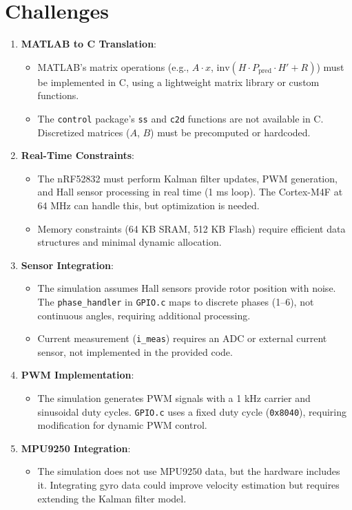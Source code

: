 \documentclass[a4paper,11pt]{article}
\begin{document}
\section{Challenges}
\begin{enumerate}
    \item \textbf{MATLAB to C Translation}:
    \begin{itemize}
        \item MATLAB's matrix operations (e.g., $A \cdot x$, $\text{inv}(H \cdot P_{\text{pred}} \cdot H' + R)$) must be implemented in C, using a lightweight matrix library or custom functions.
        \item The \texttt{control} package's \texttt{ss} and \texttt{c2d} functions are not available in C. Discretized matrices ($A$, $B$) must be precomputed or hardcoded.
    \end{itemize}
    \item \textbf{Real-Time Constraints}:
    \begin{itemize}
        \item The nRF52832 must perform Kalman filter updates, PWM generation, and Hall sensor processing in real time (1 ms loop). The Cortex-M4F at 64 MHz can handle this, but optimization is needed.
        \item Memory constraints (64 KB SRAM, 512 KB Flash) require efficient data structures and minimal dynamic allocation.
    \end{itemize}
    \item \textbf{Sensor Integration}:
    \begin{itemize}
        \item The simulation assumes Hall sensors provide rotor position with noise. The \texttt{phase\_handler} in \texttt{GPIO.c} maps to discrete phases (1--6), not continuous angles, requiring additional processing.
        \item Current measurement (\texttt{i\_meas}) requires an ADC or external current sensor, not implemented in the provided code.
    \end{itemize}
    \item \textbf{PWM Implementation}:
    \begin{itemize}
        \item The simulation generates PWM signals with a 1 kHz carrier and sinusoidal duty cycles. \texttt{GPIO.c} uses a fixed duty cycle (\texttt{0x8040}), requiring modification for dynamic PWM control.
    \end{itemize}
    \item \textbf{MPU9250 Integration}:
    \begin{itemize}
        \item The simulation does not use MPU9250 data, but the hardware includes it. Integrating gyro data could improve velocity estimation but requires extending the Kalman filter model.
    \end{itemize}
\end{enumerate}
\end{document}
